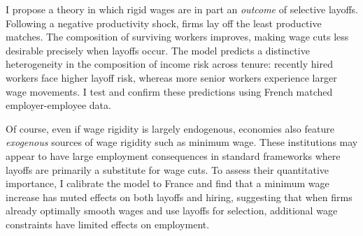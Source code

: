 I propose a theory in which rigid wages are in part an \emph{outcome} of selective layoffs. Following a negative productivity shock, firms lay off the least productive matches. The composition of surviving workers improves, making wage cuts less desirable precisely when layoffs occur. The model predicts a distinctive heterogeneity in the composition of income risk across tenure: recently hired workers face higher layoff risk, whereas more senior workers experience larger wage movements. I test and confirm these predictions using French matched employer-employee data.

Of course, even if wage rigidity is largely endogenous, economies also feature \emph{exogenous} sources of wage rigidity such as minimum wage. These institutions may appear to have large employment consequences in standard frameworks where layoffs are primarily a substitute for wage cuts. To assess their quantitative importance, I calibrate the model to France and find that a minimum wage increase has muted effects on both layoffs and hiring, suggesting that when firms already optimally smooth wages and use layoffs for selection, additional wage constraints have limited effects on employment.



